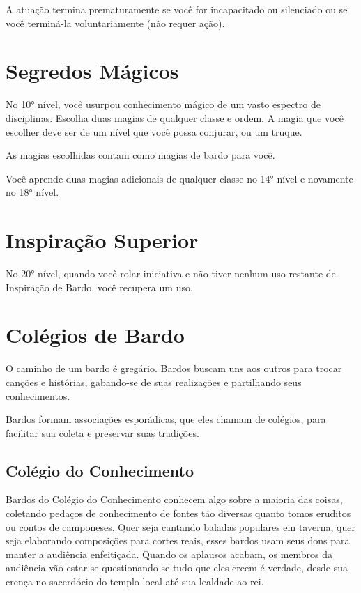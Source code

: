 \begin{multicols}{2}
A atuação termina prematuramente se você for incapacitado ou silenciado ou se
você terminá-la voluntariamente (não requer ação).

\section*{Segredos Mágicos}%

No 10° nível, você usurpou conhecimento mágico de um vasto espectro de
disciplinas. Escolha duas magias de qualquer classe e ordem. A magia que você
escolher deve ser de um nível que você possa conjurar, ou um truque.

As magias escolhidas contam como magias de bardo para você.

Você aprende duas magias adicionais de qualquer classe no 14° nível e novamente
no 18° nível.

\section*{Inspiração Superior}%

No 20° nível, quando você rolar iniciativa e não tiver nenhum uso restante de
Inspiração de Bardo, você recupera um uso.

\section*{Colégios de Bardo}%

O caminho de um bardo é gregário. Bardos buscam uns aos outros para trocar
canções e histórias, gabando-se de suas realizações e partilhando seus
conhecimentos.

Bardos formam associações esporádicas, que eles chamam de colégios, para
facilitar sua coleta e preservar suas tradições.

\subsection*{Colégio do Conhecimento}%

Bardos do Colégio do Conhecimento conhecem algo sobre a maioria das coisas,
coletando pedaços de conhecimento de fontes tão diversas quanto tomos eruditos
ou contos de camponeses. Quer seja cantando baladas populares em taverna, quer
seja elaborando composições para cortes reais, esses bardos usam seus dons para
manter a audiência enfeitiçada. Quando os aplausos acabam, os membros da
audiência vão estar se questionando se tudo que eles creem é verdade, desde sua
crença no sacerdócio do templo local até sua lealdade ao rei.


\end{multicols}

